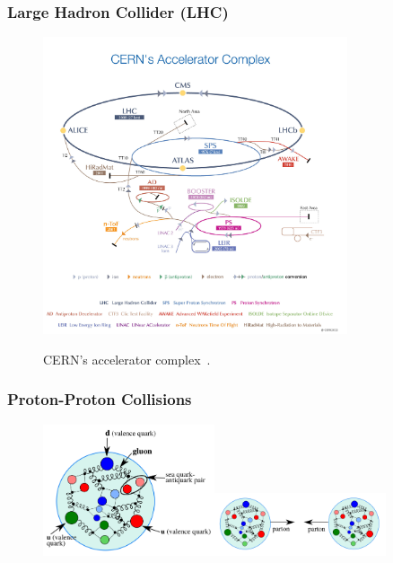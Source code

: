 \begin{frame}\frametitle{Large Hadron Collider (LHC)}
\begin{figure}[htb]
  \begin{center}
    {\includegraphics[width=0.80\textwidth]{../figs/Exp/CERN_accelerator_complex2013.jpg}}
    \caption\tiny{CERN's accelerator complex~\cite{ref_fig_CERNacceleratorComplex}.}
    \label{fig:CERN_accelerator_complex}
  \end{center}
\end{figure}
\end{frame}%


\begin{frame}\frametitle{Proton-Proton Collisions}
\begin{figure}[htb]
  \begin{center}
    {\includegraphics[width=0.45\textwidth]{../figs/Intro/protonStructure.png}\includegraphics[width=0.45\textwidth]{../figs/Intro/ppCollision.png}}
  \end{center}
\end{figure}
\end{frame}%


